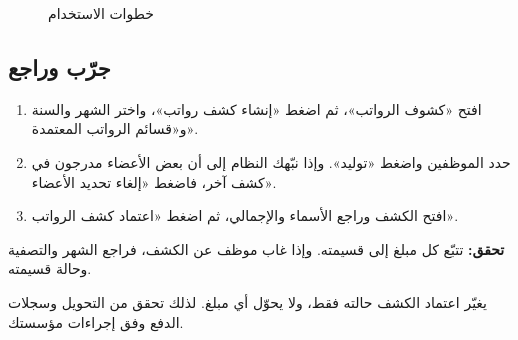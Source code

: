 \begin{figure}[H]
\centering
{}
\rclegend
\caption{خطوات الاستخدام}
\label{fig:hr-feature-payrolls-flow}
\end{figure}

\subsection{جرّب وراجع}

\begin{enumerate}
  \item افتح «كشوف الرواتب»، ثم اضغط «إنشاء كشف رواتب»، واختر الشهر والسنة و«قسائم الرواتب المعتمدة».
  \item حدد الموظفين واضغط «توليد». وإذا نبّهك النظام إلى أن بعض الأعضاء مدرجون في كشف آخر، فاضغط «إلغاء تحديد الأعضاء».
  \item افتح الكشف وراجع الأسماء والإجمالي، ثم اضغط «اعتماد كشف الرواتب».
\end{enumerate}

\textbf{تحقق:} تتبّع كل مبلغ إلى قسيمته. وإذا غاب موظف عن الكشف، فراجع الشهر والتصفية وحالة قسيمته.

\begin{rcwarn}
يغيّر اعتماد الكشف حالته فقط، ولا يحوّل أي مبلغ. لذلك تحقق من التحويل وسجلات الدفع وفق إجراءات مؤسستك.
\end{rcwarn}
